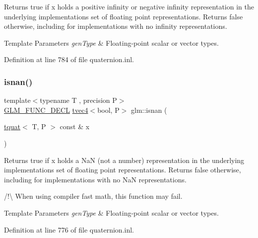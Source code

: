 Returns true if x holds a positive infinity or negative infinity representation in the underlying implementation\textquotesingle{}s set of floating point representations. Returns false otherwise, including for implementations with no infinity representations.


\begin{DoxyTemplParams}{Template Parameters}
{\em gen\+Type} & Floating-\/point scalar or vector types. \\
\hline
\end{DoxyTemplParams}


Definition at line 784 of file quaternion.\+inl.

\mbox{\label{group__gtc__quaternion_gad2fc52dd4ba5ff79cc56b3e0f9c092ed}} 
\subsubsection{\texorpdfstring{isnan()}{isnan()}}
{\footnotesize\ttfamily template$<$typename T , precision P$>$ \\
\mbox{\hyperlink{setup_8hpp_ab2d052de21a70539923e9bcbf6e83a51}{G\+L\+M\+\_\+\+F\+U\+N\+C\+\_\+\+D\+E\+CL}} \mbox{\hyperlink{structglm_1_1tvec4}{tvec4}}$<$bool, P$>$ glm\+::isnan (\begin{DoxyParamCaption}\item[{\mbox{\hyperlink{structglm_1_1tquat}{tquat}}$<$ T, P $>$ const \&}]{x }\end{DoxyParamCaption})}

Returns true if x holds a NaN (not a number) representation in the underlying implementation\textquotesingle{}s set of floating point representations. Returns false otherwise, including for implementations with no NaN representations.

/!\textbackslash{} When using compiler fast math, this function may fail.


\begin{DoxyTemplParams}{Template Parameters}
{\em gen\+Type} & Floating-\/point scalar or vector types. \\
\hline
\end{DoxyTemplParams}


Definition at line 776 of file quaternion.\+inl.

\mbox{\label{group__gtc__quaternion_gac682181783027544c8d251b4d3a60cf8}} 
